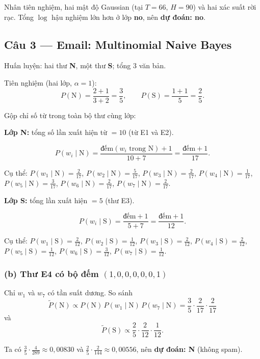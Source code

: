 Nhân tiên nghiệm, hai mật độ Gaussian (tại \(T=66\), \(H=90\)) và hai xác suất rời rạc. Tổng \(\log\) hậu nghiệm lớn hơn ở lớp \textbf{no}, nên \textbf{dự đoán: no}.

\subsection*{Câu 3 --- Email: Multinomial Naive Bayes}

Huấn luyện: hai thư \textbf{N}, một thư \textbf{S}; tổng \(3\) văn bản.

Tiên nghiệm (hai lớp, \(\alpha=1\)):
\[
P(\text{N})=\frac{2+1}{3+2}=\frac{3}{5},\qquad
P(\text{S})=\frac{1+1}{5}=\frac{2}{5}.
\]

Gộp chỉ số từ trong toàn bộ thư cùng lớp:

\medskip
\noindent\textbf{Lớp N:} tổng số lần xuất hiện từ \(=10\) (từ E1 và E2).

\[P(w_i\mid \text{N})=\frac{\text{đếm}(w_i\text{ trong N})+1}{10+7}=\frac{\text{đếm}+1}{17}.\]

Cụ thể:
\(P(w_1\mid \text{N})=\frac{2}{17}\), \(P(w_2\mid \text{N})=\frac{5}{17}\), \(P(w_3\mid \text{N})=\frac{2}{17}\), \(P(w_4\mid \text{N})=\frac{1}{17}\), \(P(w_5\mid \text{N})=\frac{3}{17}\), \(P(w_6\mid \text{N})=\frac{2}{17}\), \(P(w_7\mid \text{N})=\frac{2}{17}\).

\noindent\textbf{Lớp S:} tổng lần xuất hiện \(=5\) (thư E3).

\[P(w_i\mid \text{S})=\frac{\text{đếm}+1}{5+7}=\frac{\text{đếm}+1}{12}.\]

Cụ thể:
\(P(w_1\mid \text{S})=\frac{2}{12}\), \(P(w_2\mid \text{S})=\frac{1}{12}\), \(P(w_3\mid \text{S})=\frac{2}{12}\), \(P(w_4\mid \text{S})=\frac{2}{12}\), \(P(w_5\mid \text{S})=\frac{1}{12}\), \(P(w_6\mid \text{S})=\frac{3}{12}\), \(P(w_7\mid \text{S})=\frac{1}{12}\).

\subsubsection*{(b) Thư E4 có bộ đếm \((1,0,0,0,0,0,1)\)}

Chỉ \(w_1\) và \(w_7\) có tần suất dương. So sánh
\[
\tilde P(\text{N})\propto P(\text{N})\,P(w_1\mid \text{N})\,P(w_7\mid \text{N})
=\frac{3}{5}\cdot\frac{2}{17}\cdot\frac{2}{17}
\]
và
\[
\tilde P(\text{S})\propto \frac{2}{5}\cdot\frac{2}{12}\cdot\frac{1}{12}.
\]

Ta có \(\frac{3}{5}\cdot\frac{4}{289}\approx 0{,}00830\) và \(\frac{2}{5}\cdot\frac{2}{144}\approx 0{,}00556\), nên \textbf{dự đoán: N} (không spam).
